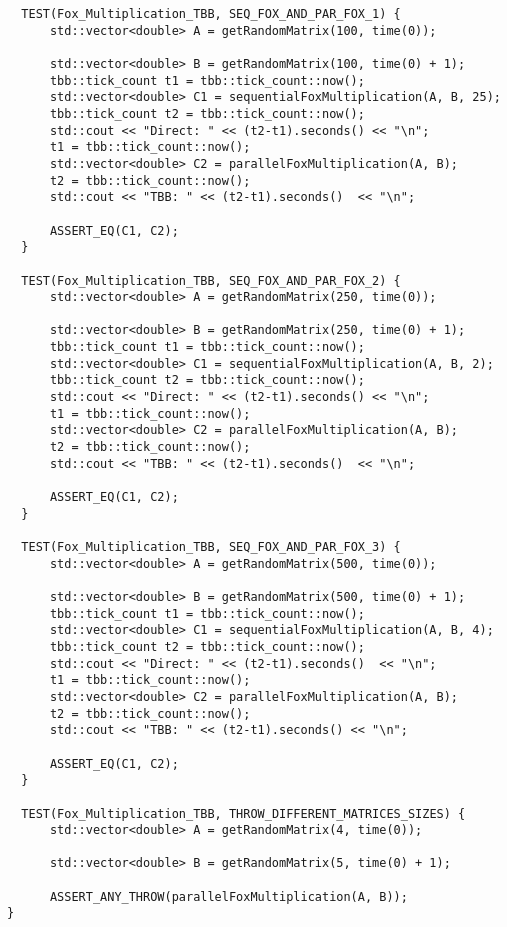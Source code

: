 \documentclass{article}
\begin{document}
\begin{lstlisting}
  TEST(Fox_Multiplication_TBB, SEQ_FOX_AND_PAR_FOX_1) {
      std::vector<double> A = getRandomMatrix(100, time(0));

      std::vector<double> B = getRandomMatrix(100, time(0) + 1);
      tbb::tick_count t1 = tbb::tick_count::now();
      std::vector<double> C1 = sequentialFoxMultiplication(A, B, 25);
      tbb::tick_count t2 = tbb::tick_count::now();
      std::cout << "Direct: " << (t2-t1).seconds() << "\n";
      t1 = tbb::tick_count::now();
      std::vector<double> C2 = parallelFoxMultiplication(A, B);
      t2 = tbb::tick_count::now();
      std::cout << "TBB: " << (t2-t1).seconds()  << "\n";

      ASSERT_EQ(C1, C2);
  }

  TEST(Fox_Multiplication_TBB, SEQ_FOX_AND_PAR_FOX_2) {
      std::vector<double> A = getRandomMatrix(250, time(0));

      std::vector<double> B = getRandomMatrix(250, time(0) + 1);
      tbb::tick_count t1 = tbb::tick_count::now();
      std::vector<double> C1 = sequentialFoxMultiplication(A, B, 2);
      tbb::tick_count t2 = tbb::tick_count::now();
      std::cout << "Direct: " << (t2-t1).seconds() << "\n";
      t1 = tbb::tick_count::now();
      std::vector<double> C2 = parallelFoxMultiplication(A, B);
      t2 = tbb::tick_count::now();
      std::cout << "TBB: " << (t2-t1).seconds()  << "\n";

      ASSERT_EQ(C1, C2);
  }

  TEST(Fox_Multiplication_TBB, SEQ_FOX_AND_PAR_FOX_3) {
      std::vector<double> A = getRandomMatrix(500, time(0));

      std::vector<double> B = getRandomMatrix(500, time(0) + 1);
      tbb::tick_count t1 = tbb::tick_count::now();
      std::vector<double> C1 = sequentialFoxMultiplication(A, B, 4);
      tbb::tick_count t2 = tbb::tick_count::now();
      std::cout << "Direct: " << (t2-t1).seconds()  << "\n";
      t1 = tbb::tick_count::now();
      std::vector<double> C2 = parallelFoxMultiplication(A, B);
      t2 = tbb::tick_count::now();
      std::cout << "TBB: " << (t2-t1).seconds() << "\n";

      ASSERT_EQ(C1, C2);
  }

  TEST(Fox_Multiplication_TBB, THROW_DIFFERENT_MATRICES_SIZES) {
      std::vector<double> A = getRandomMatrix(4, time(0));

      std::vector<double> B = getRandomMatrix(5, time(0) + 1);

      ASSERT_ANY_THROW(parallelFoxMultiplication(A, B));
}
\end{lstlisting}
\end{document}
